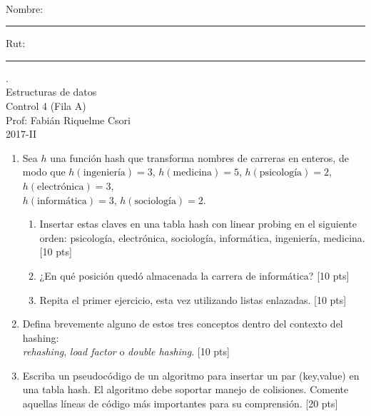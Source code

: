 \documentclass[letter,12pt,oneside]{book}
\theoremstyle{definition}
\begin{document}

\begin{center}
$~$
\end{center}

\noindent
Nombre: \rule{.6\textwidth}{.5pt} Rut: \rule{.24\textwidth}{.5pt}

\begin{center}
 {\Large
  {\color{white}.}\\
  Estructuras de datos\\[1ex]
  Control 4 (Fila A)}\\[1.2ex]
  Prof: Fabián Riquelme Csori\\
  2017-II
\end{center}

\begin{enumerate}
    \item Sea $h$ una función hash que transforma nombres de carreras en enteros, de modo que $h(\mbox{ingeniería})=3$, $h(\mbox{medicina})=5$, $h(\mbox{psicología})=2$, $h(\mbox{electrónica})=3$,\\ $h(\mbox{informática})=3$, $h(\mbox{sociología})=2$.
    \begin{enumerate}
        \item Insertar estas claves en una tabla hash con linear probing en el siguiente orden: psicología, electrónica, sociología, informática, ingeniería, medicina. \tabto{76ex} [10 pts]
        \item ¿En qué posición quedó almacenada la carrera de informática? \tabto{76ex} [10 pts]
        \item Repita el primer ejercicio, esta vez utilizando listas enlazadas. \tabto{76ex} [10 pts]
    \end{enumerate}
    \item Defina brevemente alguno de estos tres conceptos dentro del contexto del hashing:\\ {\em rehashing}, {\em load factor} o {\em double hashing}. \tabto{81ex} [10 pts]
    \item Escriba un pseudocódigo de un algoritmo para insertar un par (key,value) en una tabla hash. El algoritmo debe soportar manejo de colisiones. Comente aquellas líneas de código más importantes para su comprensión. \tabto{81ex} [20 pts]
\end{enumerate}

\newpage
\end{document}
